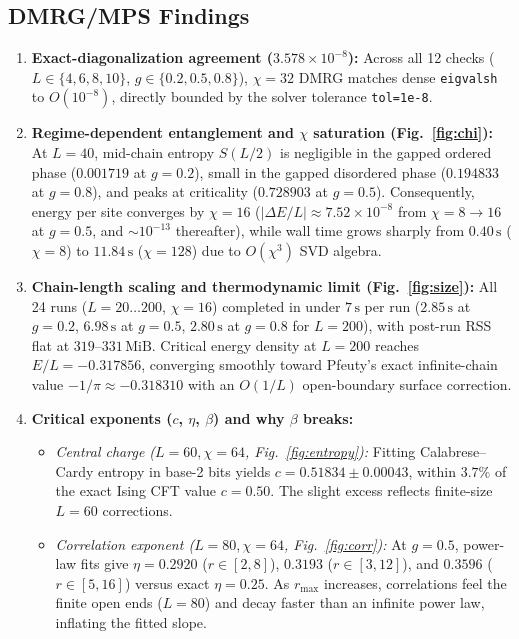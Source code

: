 \documentclass[11pt,a4paper]{article}
\begin{document}
\subsection{DMRG/MPS Findings}
\begin{enumerate}[leftmargin=*]
\item \textbf{Exact-diagonalization agreement ($3.578\times 10^{-8}$):} Across all 12 checks ($L \in \{4,6,8,10\}$, $g \in \{0.2, 0.5, 0.8\}$), $\chi=32$ DMRG matches dense \texttt{eigvalsh} to $O(10^{-8})$, directly bounded by the solver tolerance \texttt{tol=1e-8}.
\item \textbf{Regime-dependent entanglement and $\chi$ saturation (Fig.~\ref{fig:chi}):} At $L=40$, mid-chain entropy $S(L/2)$ is negligible in the gapped ordered phase ($0.001719$ at $g=0.2$), small in the gapped disordered phase ($0.194833$ at $g=0.8$), and peaks at criticality ($0.728903$ at $g=0.5$). Consequently, energy per site converges by $\chi=16$ ($|\Delta E/L| \approx 7.52\times 10^{-8}$ from $\chi=8 \to 16$ at $g=0.5$, and $\sim 10^{-13}$ thereafter), while wall time grows sharply from $0.40\,\mathrm{s}$ ($\chi=8$) to $11.84\,\mathrm{s}$ ($\chi=128$) due to $O(\chi^3)$ SVD algebra.
\item \textbf{Chain-length scaling and thermodynamic limit (Fig.~\ref{fig:size}):} All 24 runs ($L=20\dots 200$, $\chi=16$) completed in under $7\,\mathrm{s}$ per run ($2.85\,\mathrm{s}$ at $g=0.2$, $6.98\,\mathrm{s}$ at $g=0.5$, $2.80\,\mathrm{s}$ at $g=0.8$ for $L=200$), with post-run RSS flat at $319\text{--}331\,\mathrm{MiB}$. Critical energy density at $L=200$ reaches $E/L = -0.317856$, converging smoothly toward Pfeuty's exact infinite-chain value $-1/\pi \approx -0.318310$ with an $O(1/L)$ open-boundary surface correction.
\item \textbf{Critical exponents ($c$, $\eta$, $\beta$) and why $\beta$ breaks:}
  \begin{itemize}
  \item \emph{Central charge ($L=60, \chi=64$, Fig.~\ref{fig:entropy}):} Fitting Calabrese--Cardy entropy in base-2 bits yields $c = 0.51834 \pm 0.00043$, within $3.7\%$ of the exact Ising CFT value $c = 0.50$. The slight excess reflects finite-size $L=60$ corrections.
  \item \emph{Correlation exponent ($L=80, \chi=64$, Fig.~\ref{fig:corr}):} At $g=0.5$, power-law fits give $\eta = 0.2920$ ($r\in[2,8]$), $0.3193$ ($r\in[3,12]$), and $0.3596$ ($r\in[5,16]$) versus exact $\eta = 0.25$. As $r_{\max}$ increases, correlations feel the finite open ends ($L=80$) and decay faster than an infinite power law, inflating the fitted slope.

\end{itemize}
\end{enumerate}
\end{document}
